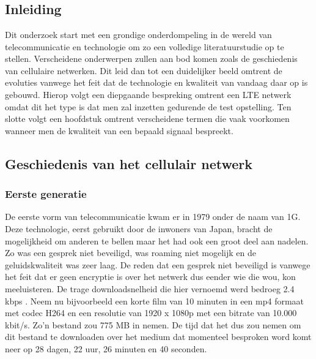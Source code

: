 \chapter{}%
\label{ch:stand-van-zaken}



\section{Inleiding}

Dit onderzoek start met een grondige onderdompeling in de wereld van telecommunicatie en technologie om zo een volledige literatuurstudie op te stellen. Verscheidene onderwerpen zullen aan bod komen zoals de geschiedenis van cellulaire netwerken. Dit leid dan tot een duidelijker beeld omtrent de evoluties vanwege het feit dat de technologie en kwaliteit van vandaag daar op is gebouwd. Hierop volgt een diepgaande bespreking omtrent een LTE netwerk omdat dit het type is dat men zal inzetten gedurende de test opstelling. Ten slotte volgt een hoofdstuk omtrent verscheidene termen die vaak voorkomen wanneer men de kwaliteit van een bepaald signaal bespreekt.

\section{Geschiedenis van het cellulair netwerk}

\subsection{Eerste generatie}

De eerste vorm van telecommunicatie kwam er in 1979 onder de naam van 1G. Deze technologie, eerst gebruikt door de inwoners van Japan, bracht de mogelijkheid om anderen te bellen maar het had ook een groot deel aan nadelen. Zo was een gesprek niet beveiligd, was roaming niet mogelijk en de geluidskwaliteit was zeer laag.
De reden dat een gesprek niet beveiligd is vanwege het feit dat er geen encryptie is over het netwerk dus eender wie die wou, kon meeluisteren. De trage downloadsnelheid die hier vernoemd werd bedroeg 2.4 kbps \autocite{Galazzo2020}. Neem nu bijvoorbeeld een korte film van 10 minuten in een mp4 formaat met codec H264 en een resolutie van 1920 x 1080p met een bitrate van 10.000 kbit/s. Zo'n bestand zou 775 MB in nemen. \autocite{Helme2019} De tijd dat het dus zou nemen om dit bestand te downloaden over het medium dat momenteel besproken word komt neer op 28 dagen, 22 uur, 26 minuten en 40 seconden. \autocite{Wooding2024}

